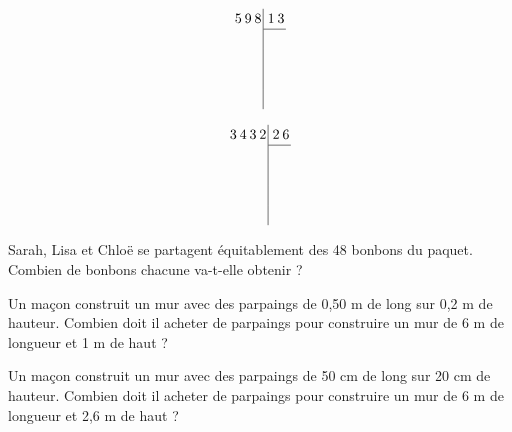 \begin{minipage}{0.48\linewidth}
\begin{equation*}
\renewcommand{\arraystretch}{1.2}
\renewcommand{\arraycolsep}{1pt}
  \begin{array}{ rrr|rrr}
  5 & 9 & 8 &   & 1 & 3 \\
\cline{4-6}
   &   &   &   &   &   \\
   &   &   &   &   &   \\
   &   &   &   &   &   \\
   &   &   &   &   &   \\
  \end{array}
\end{equation*}
\end{minipage}
\begin{minipage}{0.48\linewidth}
\begin{equation*}
\renewcommand{\arraystretch}{1.2}
\renewcommand{\arraycolsep}{1pt}
  \begin{array}{rrrr|rrr}
3 & 4 & 3 & 2 &   & 2 & 6 \\
\cline{5-7}
  &   &   &   &   &   &   \\
  &   &   &   &   &   &   \\
  &   &   &   &   &   &   \\
  &   &   &   &   &   &   \\
  \end{array}
\end{equation*}
\end{minipage}



Sarah, Lisa et Chloë se partagent équitablement des 48 bonbons du paquet. Combien de bonbons chacune va-t-elle obtenir ?





Un maçon construit un mur avec des parpaings de 0,50 m de long sur 0,2 m de hauteur. Combien doit il acheter de parpaings pour construire un mur de 6 m de longueur et 1 m de haut ?



Un maçon construit un mur avec des parpaings de 50 cm de long sur 20 cm de hauteur. Combien doit il acheter de parpaings pour construire un mur de 6 m de longueur et 2,6 m de haut ?




